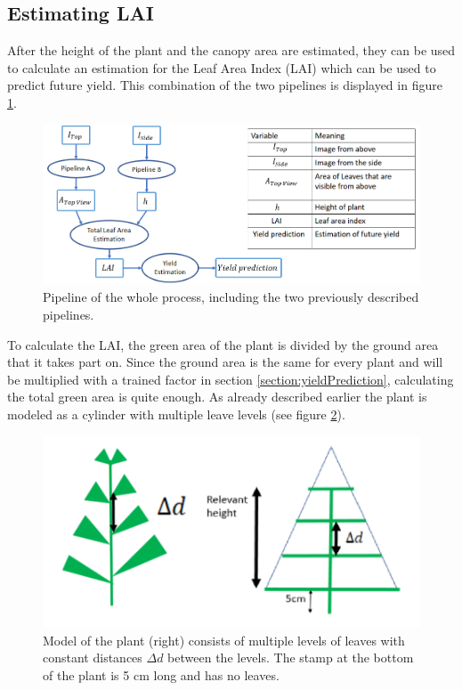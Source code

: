 \subsection{Estimating LAI}

\label{section:EstLAI}
After the height of the plant and the canopy area are estimated, they can be used to calculate an estimation for the Leaf Area Index (LAI) which can be used to predict future yield. This combination of the two pipelines is displayed in figure \ref{fig:wholePipeline}.
   \begin{figure}[H]
       \centering
       \includegraphics[scale=0.6]{wholePipeline.PNG}
       \caption{Pipeline of the whole process, including the two previously described pipelines.}
       \label{fig:wholePipeline}
   \end{figure}
To calculate the LAI, the green area of the plant is divided by the ground area that it takes part on. Since the ground area is the same for every plant and will be multiplied with a trained factor in section \ref{section:yieldPrediction}, calculating the total green area is quite enough. As already described earlier the plant is modeled as a cylinder with multiple leave levels (see figure \ref{fig:branchRepetition}).
   \begin{figure}[H]
       \centering
       \includegraphics[scale=0.6]{branchRepetition.PNG}
       \caption{Model of the plant (right) consists of multiple levels of leaves with constant distances $\Delta d$ between the levels. The stamp at the bottom of the plant is 5 cm long and has no leaves.}
       \label{fig:branchRepetition}
   \end{figure}
